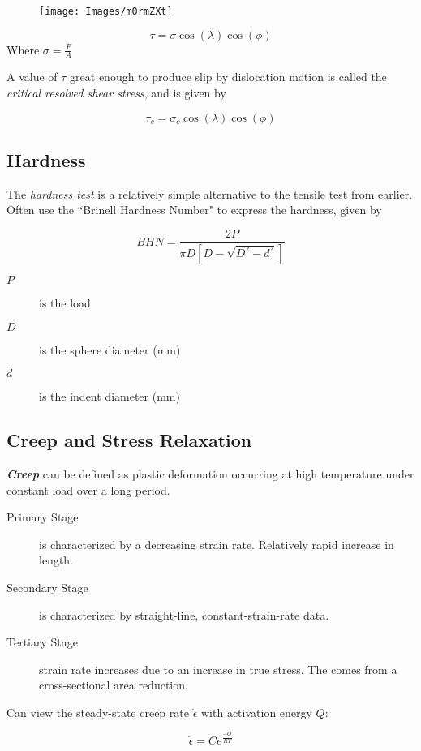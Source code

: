 \documentclass[10pt,letterpaper]{article}
\begin{document}
	\begin{figure}
\centering
\texttt{[image: Images/m0rmZXt]}
\caption{}
\label{fig:m0rmZXt}
\end{figure}

	$$
	\tau = \sigma \cos( \lambda ) \cos(\phi)
	$$
	Where $\sigma = \frac{F}{A}$ 
	
	A value of $\tau$ great enough to produce slip by dislocation motion is called the \textit{critical resolved shear stress}, and is given by
	
	$$
	\tau_c = \sigma_c \cos (\lambda) \cos (\phi)
	$$
	
	\subsection{Hardness}
	The \textit{hardness test} is a relatively simple alternative to the tensile test from earlier. Often use the ``Brinell Hardness Number" to express the hardness, given by
	
	$$
	BHN = \frac{2P}{\pi D [D - \sqrt{D^2 - d^2}]}
	$$
	\begin{description}
		\item[$P$] is the load
		\item[$D$] is the sphere diameter (mm)
		\item[$d$] is the indent diameter (mm)
	\end{description}
	\subsection{Creep and Stress Relaxation}
	\textit{\textbf{Creep}} can be defined as plastic deformation occurring at high temperature under constant load over a long period. 
	\begin{description}
		\item[Primary Stage] is characterized by a decreasing strain rate.  Relatively rapid increase in length. 
		\item[Secondary Stage] is characterized by straight-line, constant-strain-rate data. 
		\item[Tertiary Stage] strain rate increases due to an increase in true stress.  The comes from a cross-sectional area reduction. 
	\end{description} 
	
	Can view the steady-state creep rate $\dot{\epsilon}$ with activation energy $Q$: 
	
	$$
	\dot{\epsilon} = Ce^{\frac{-Q}{RT}}
	$$
	
\end{document}
